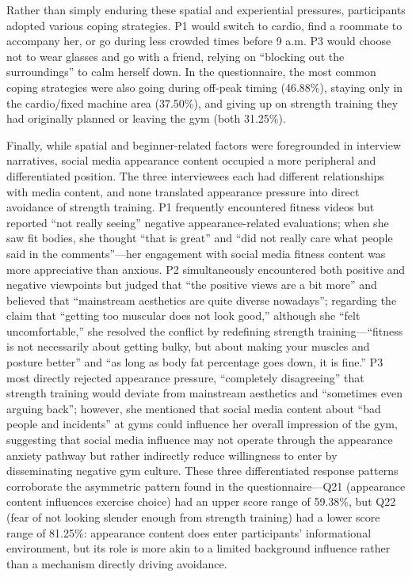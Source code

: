 Rather than simply enduring these spatial and experiential pressures, participants adopted various coping strategies.
P1 would switch to cardio, find a roommate to accompany her, or go during less crowded times before 9 a.m.
P3 would choose not to wear glasses and go with a friend, relying on ``blocking out the surroundings'' to calm herself down.
In the questionnaire, the most common coping strategies were also going during off-peak timing (46.88\%), staying only in the cardio/fixed machine area (37.50\%), and giving up on strength training they had originally planned or leaving the gym (both 31.25\%).

Finally, while spatial and beginner-related factors were foregrounded in interview narratives, social media appearance content occupied a more peripheral and differentiated position.
The three interviewees each had different relationships with media content, and none translated appearance pressure into direct avoidance of strength training.
P1 frequently encountered fitness videos but reported ``not really seeing'' negative appearance-related evaluations; when she saw fit bodies, she thought ``that is great'' and ``did not really care what people said in the comments''---her engagement with social media fitness content was more appreciative than anxious.
P2 simultaneously encountered both positive and negative viewpoints but judged that ``the positive views are a bit more'' and believed that ``mainstream aesthetics are quite diverse nowadays''; regarding the claim that ``getting too muscular does not look good,'' although she ``felt uncomfortable,'' she resolved the conflict by redefining strength training---``fitness is not necessarily about getting bulky, but about making your muscles and posture better'' and ``as long as body fat percentage goes down, it is fine.''
P3 most directly rejected appearance pressure, ``completely disagreeing'' that strength training would deviate from mainstream aesthetics and ``sometimes even arguing back''; however, she mentioned that social media content about ``bad people and incidents'' at gyms could influence her overall impression of the gym, suggesting that social media influence may not operate through the appearance anxiety pathway but rather indirectly reduce willingness to enter by disseminating negative gym culture.
These three differentiated response patterns corroborate the asymmetric pattern found in the questionnaire---Q21 (appearance content influences exercise choice) had an upper score range of 59.38\%, but Q22 (fear of not looking slender enough from strength training) had a lower score range of 81.25\%: appearance content does enter participants' informational environment, but its role is more akin to a limited background influence rather than a mechanism directly driving avoidance.

